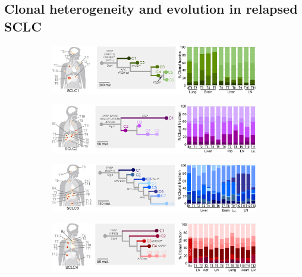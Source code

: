 \subsection{Clonal heterogeneity and evolution in relapsed SCLC}
\begin{figure}[htbp]
    \centering
    \begin{subfigure}{0.85\textwidth}
        \includegraphics[width=\linewidth,keepaspectratio]{images/sclc/clones_sclc1}
        \vspace{-1cm}
        \caption{}\label{fig:sclc:clones_1}
    \end{subfigure}
    
    \vspace{0.5cm}
    \begin{subfigure}{0.85\textwidth}
        \includegraphics[width=\linewidth,keepaspectratio]{images/sclc/clones_sclc2}
        \vspace{-1cm}
        \caption{}\label{fig:sclc:clones_2}
    \end{subfigure}

    \vspace{0.5cm}
    \begin{subfigure}{0.85\textwidth}
        \includegraphics[width=\linewidth,keepaspectratio]{images/sclc/clones_sclc3}
        \vspace{-1cm}
        \caption{}\label{fig:sclc:clones_3}
    \end{subfigure}

    \vspace{0.5cm}
    \begin{subfigure}{0.85\textwidth}
        \includegraphics[width=\linewidth,keepaspectratio]{images/sclc/clones_sclc4}
        \vspace{-1cm}
        \caption{}\label{fig:sclc:clones_4}
    \end{subfigure}
    

\end{figure}
